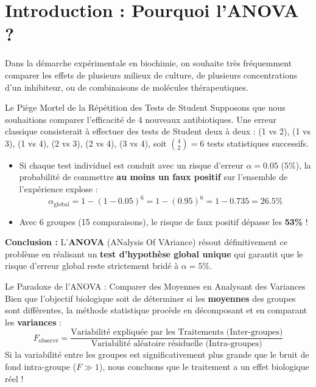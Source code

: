 \documentclass[11pt,a4paper]{article}
\begin{document}

\section{Introduction : Pourquoi l'ANOVA ?}

Dans la démarche expérimentale en biochimie, on souhaite très fréquemment comparer les effets de plusieurs milieux de culture, de plusieurs concentrations d'un inhibiteur, ou de combinaisons de molécules thérapeutiques.

\begin{warnbox}{Le Piège Mortel de la Répétition des Tests de Student}
Supposons que nous souhaitions comparer l'efficacité de 4 nouveaux antibiotiques. Une erreur classique consisterait à effectuer des tests de Student deux à deux : (1 vs 2), (1 vs 3), (1 vs 4), (2 vs 3), (2 vs 4), (3 vs 4), soit $\binom{4}{2} = 6$ tests statistiques successifs.
\begin{itemize}[leftmargin=*, label=\faTimes]
  \item Si chaque test individuel est conduit avec un risque d'erreur $\alpha = 0.05$ ($5\%$), la probabilité de commettre \textbf{au moins un faux positif} sur l'ensemble de l'expérience explose :
  \begin{equation*}
    \alpha_{\text{global}} = 1 - (1 - 0.05)^6 = 1 - (0.95)^6 = 1 - 0.735 = \mathbf{26.5\%}
  \end{equation*}
  \item Avec 6 groupes (15 comparaisons), le risque de faux positif dépasse les \textbf{53\%} !
\end{itemize}
\textbf{Conclusion :} L'\textbf{ANOVA} (ANalysis Of VAriance) résout définitivement ce problème en réalisant un \textbf{test d'hypothèse global unique} qui garantit que le risque d'erreur global reste strictement bridé à $\alpha = 5\%$.
\end{warnbox}

\begin{conceptbox}{Le Paradoxe de l'ANOVA : Comparer des Moyennes en Analysant des Variances}
Bien que l'objectif biologique soit de déterminer si les \textbf{moyennes} des groupes sont différentes, la méthode statistique procède en décomposant et en comparant les \textbf{variances} :
\begin{equation*}
F_{\text{observé}} = \frac{\text{Variabilité expliquée par les Traitements (Inter-groupes)}}{\text{Variabilité aléatoire résiduelle (Intra-groupes)}}
\end{equation*}
Si la variabilité entre les groupes est significativement plus grande que le bruit de fond intra-groupe ($F \gg 1$), nous concluons que le traitement a un effet biologique réel !
\end{conceptbox}
\end{document}
